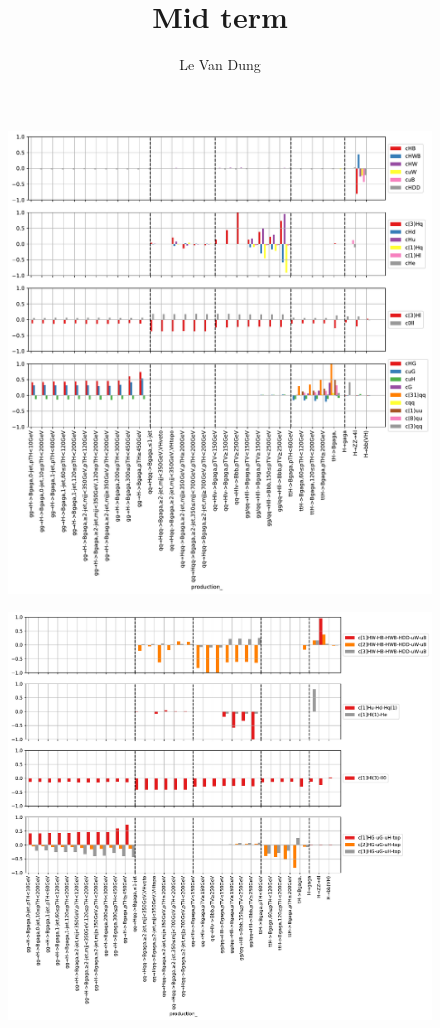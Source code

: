 \documentclass{article}
\author{Le Van Dung}
\date{ }
\title{Mid term}
\begin{document}
\begin{figure}[h!]
 \includegraphics[scale=0.4]{../parameter.pdf}
\end{figure}
\begin{figure}[h!]
 \includegraphics[scale=0.4]{../rotated_parameter.pdf}
\end{figure}
\end{document}
